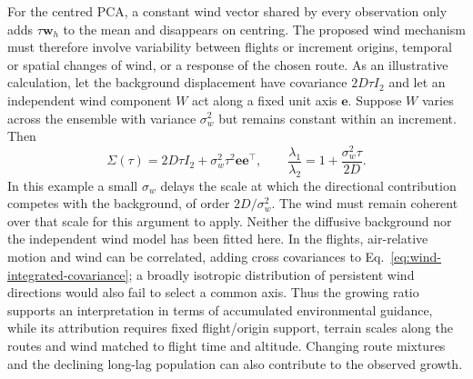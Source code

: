For the centred PCA, a constant wind vector shared by every observation only
adds $\tau\mathbf w_h$ to the mean and disappears on centring. The proposed wind
mechanism must therefore involve variability between flights or increment
origins, temporal or spatial changes of wind, or a response of the chosen route.
As an illustrative calculation, let the background displacement have covariance
$2D\tau I_2$ and let an independent wind component $W$ act along a fixed unit
axis $\mathbf e$. Suppose $W$ varies across the ensemble with variance
$\sigma_w^2$ but remains constant within an increment. Then
\begin{equation}
 \Sigma(\tau)=2D\tau I_2+\sigma_w^2\tau^2\mathbf e\mathbf e^\top,
 \qquad
 \frac{\lambda_1}{\lambda_2}=1+\frac{\sigma_w^2\tau}{2D}.
 \label{eq:wind-anisotropy-example}
\end{equation}
In this example a small $\sigma_w$ delays the scale at which the directional
contribution competes with the background, of order $2D/\sigma_w^2$. The wind
must remain coherent over that scale for this argument to apply. Neither the
diffusive background nor the independent wind model has been fitted here.
In the flights, air-relative motion and wind can be correlated, adding cross
covariances to Eq.~\eqref{eq:wind-integrated-covariance}; a broadly isotropic
distribution of persistent wind directions would also fail to select a common
axis. Thus the growing ratio supports an interpretation in terms of accumulated
environmental guidance, while its attribution requires fixed flight/origin
support, terrain scales along the routes and wind matched to flight time and
altitude. Changing route mixtures and the declining long-lag population can
also contribute to the observed growth.

